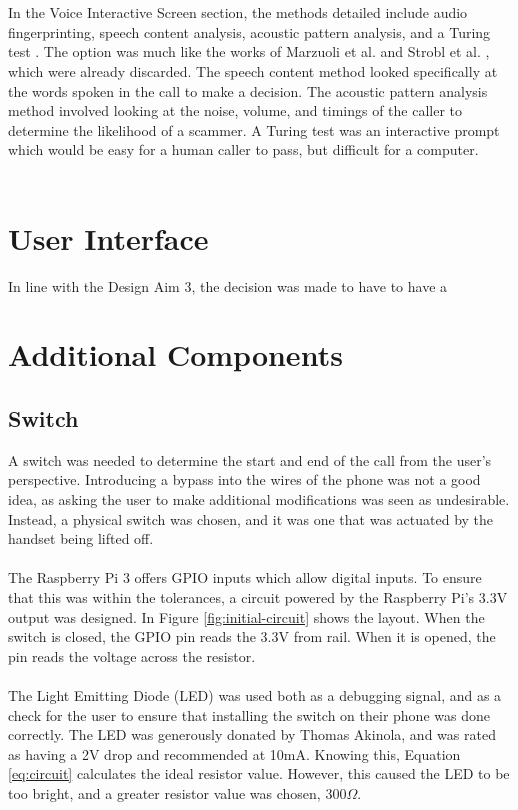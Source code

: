 \documentclass[main.tex]{subfiles}
\begin{document}
\\\\
In the Voice Interactive Screen section, the methods detailed include audio fingerprinting, speech content analysis, acoustic pattern analysis, and a Turing test \cite{cisco}. The option was much like the works of Marzuoli et al. \cite{marzuoli} and Strobl et al. \cite{strobl}, which were already discarded. The speech content method looked specifically at the words spoken in the call to make a decision. The acoustic pattern analysis method involved looking at the noise, volume, and timings of the caller to determine the likelihood of a scammer. A Turing test was an interactive prompt which would be easy for a human caller to pass, but difficult for a computer.
\\\\


\section{User Interface}
In line with the Design Aim 3, the decision was made to have to have a

\section{Additional Components}
\subsection{Switch}
A switch was needed to determine the start and end of the call from the user's perspective. Introducing a bypass into the wires of the phone was not a good idea, as asking the user to make additional modifications was seen as undesirable. Instead, a physical switch was chosen, and it was one that was actuated by the handset being lifted off.
\\\\
The Raspberry Pi 3 offers GPIO inputs which allow digital inputs. To ensure that this was within the tolerances, a circuit powered by the Raspberry Pi's 3.3V output was designed. In Figure \ref{fig:initial-circuit} shows the layout. When the switch is closed, the GPIO pin reads the 3.3V from rail. When it is opened, the pin reads the voltage across the resistor.
\\\\
The Light Emitting Diode (LED) was used both as a debugging signal, and as a check for the user to ensure that installing the switch on their phone was done correctly. The LED was generously donated by Thomas Akinola, and was rated as having a 2V drop and recommended at 10mA. Knowing this, Equation \ref{eq:circuit} calculates the ideal resistor value. However, this caused the LED to be too bright, and a greater resistor value was chosen, $300\Omega$.
\end{document}
